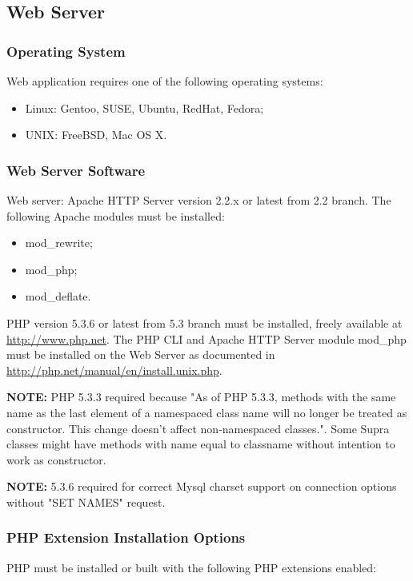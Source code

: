 \documentclass[12pt]{article}
\newcommand{\vigShowNotes}{1}
\newcommand{\note}[1]{
\textbf{NOTE:} 
#1
}
\begin{document}
\subsection{Web Server}

\subsubsection{Operating System}
Web application requires one of the following operating systems:
\begin{itemize}
	\item Linux: Gentoo, SUSE, Ubuntu, RedHat, Fedora;
	\item UNIX: FreeBSD, Mac OS X.
\end{itemize}

\subsubsection{Web Server Software}
Web server: Apache HTTP Server version 2.2.x or latest from 2.2 branch. The following Apache modules must be installed:
\begin{itemize}
	\item mod\_rewrite;
	\item mod\_php;
	\item mod\_deflate.
\end{itemize}

PHP version 5.3.6 or latest from 5.3 branch must be installed, freely available at \url{http://www.php.net}. The PHP CLI and Apache HTTP Server module \textsf{mod\_php} must be installed on the Web Server as documented in \url{http://php.net/manual/en/install.unix.php}.

\note{PHP 5.3.3 required because "As of PHP 5.3.3, methods with the same name as the last element of a namespaced class name will no longer be treated as constructor. This change doesn't affect non-namespaced classes.". Some Supra classes might have methods with name equal to classname without intention to work as constructor.}
	
	\note{5.3.6 required for correct Mysql charset support on connection options without "SET NAMES" request.}

\subsubsection{PHP Extension Installation Options}

PHP must be installed or built with the following PHP extensions enabled:
\end{document}

